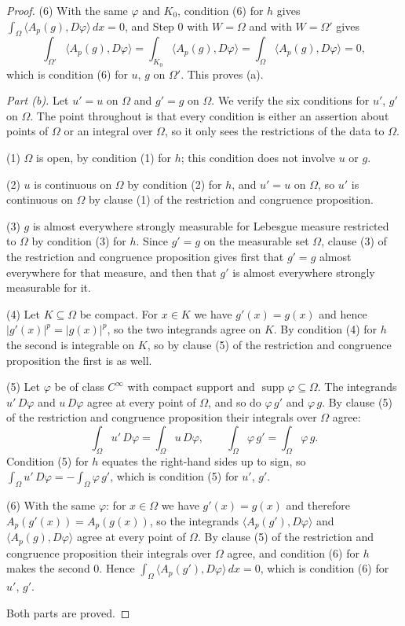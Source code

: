 \begin{proof}
(6) With the same $\varphi$ and $K_0$, condition (6) for $h$ gives
$\int_\Omega\langle A_p(g),D\varphi\rangle\,dx=0$, and Step 0 with $W=\Omega$ and with
$W=\Omega'$ gives
\[
  \int_{\Omega'}\bigl\langle A_p(g),D\varphi\bigr\rangle
  =\int_{K_0}\bigl\langle A_p(g),D\varphi\bigr\rangle
  =\int_\Omega\bigl\langle A_p(g),D\varphi\bigr\rangle=0 ,
\]
which is condition (6) for $u$, $g$ on $\Omega'$.  This proves (a).

\medskip\noindent\emph{Part (b).}
Let $u'=u$ on $\Omega$ and $g'=g$ on $\Omega$.  We verify the six conditions for $u'$, $g'$ on
$\Omega$.  The point throughout is that every condition is either an assertion about points of
$\Omega$ or an integral over $\Omega$, so it only sees the restrictions of the data to $\Omega$.

(1) $\Omega$ is open, by condition (1) for $h$; this condition does not involve $u$ or $g$.

(2) $u$ is continuous on $\Omega$ by condition (2) for $h$, and $u'=u$ on $\Omega$, so $u'$ is
continuous on $\Omega$ by clause (1) of the restriction and congruence proposition.

(3) $g$ is almost everywhere strongly measurable for Lebesgue measure restricted to $\Omega$ by
condition (3) for $h$.  Since $g'=g$ on the measurable set $\Omega$, clause (3) of the
restriction and congruence proposition gives first that $g'=g$ almost everywhere for that
measure, and then that $g'$ is almost everywhere strongly measurable for it.

(4) Let $K\subseteq\Omega$ be compact.  For $x\in K$ we have $g'(x)=g(x)$ and hence
$\lvert g'(x)\rvert^{p}=\lvert g(x)\rvert^{p}$, so the two integrands agree on $K$.  By
condition (4) for $h$ the second is integrable on $K$, so by clause (5) of the restriction and
congruence proposition the first is as well.

(5) Let $\varphi$ be of class $C^\infty$ with compact support and
$\operatorname{supp}\varphi\subseteq\Omega$.  The integrands $u'\,D\varphi$ and $u\,D\varphi$
agree at every point of $\Omega$, and so do $\varphi\,g'$ and $\varphi\,g$.  By clause (5) of
the restriction and congruence proposition their integrals over $\Omega$ agree:
\[
  \int_\Omega u'\,D\varphi=\int_\Omega u\,D\varphi,\qquad
  \int_\Omega\varphi\,g'=\int_\Omega\varphi\,g .
\]
Condition (5) for $h$ equates the right-hand sides up to sign, so
$\int_\Omega u'\,D\varphi=-\int_\Omega\varphi\,g'$, which is condition (5) for $u'$, $g'$.

(6) With the same $\varphi$: for $x\in\Omega$ we have $g'(x)=g(x)$ and therefore
$A_p(g'(x))=A_p(g(x))$, so the integrands $\langle A_p(g'),D\varphi\rangle$ and
$\langle A_p(g),D\varphi\rangle$ agree at every point of $\Omega$.  By clause (5) of the
restriction and congruence proposition their integrals over $\Omega$ agree, and condition (6)
for $h$ makes the second $0$.  Hence
$\int_\Omega\langle A_p(g'),D\varphi\rangle\,dx=0$, which is condition (6) for $u'$, $g'$.

\medskip\noindent Both parts are proved.
\end{proof}
